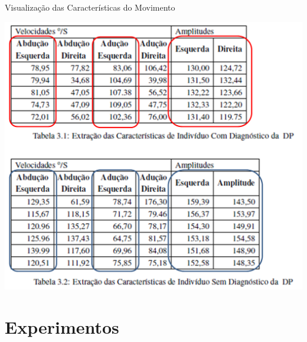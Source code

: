 \documentclass{beamer}
\begin{document}


\begin{frame}{Visualização das Características do Movimento}
  \begin{block}{}
      \center \includegraphics[height=3.2 in]{img/caracteristicas-tabela.png}
  \end{block}
\end{frame}

\section{Experimentos}
\end{document}
